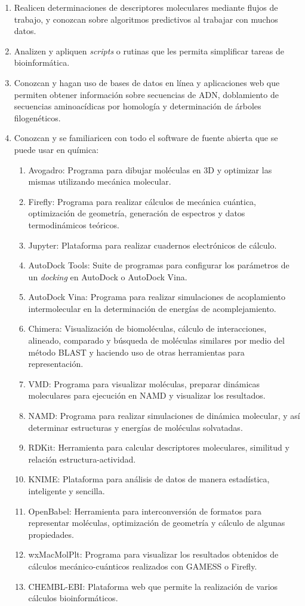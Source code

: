 \documentclass[10pt,letterpaper]{article}
\begin{document}
\begin{enumerate}
\item Realicen determinaciones de descriptores moleculares mediante flujos de trabajo, y conozcan sobre algoritmos predictivos al trabajar con muchos datos.
\item Analizen y apliquen \emph{scripts} o rutinas que les permita simplificar tareas de bioinform\'atica.
\item Conozcan y hagan uso de bases de datos en l\'inea y aplicaciones web que permiten obtener informaci\'on sobre secuencias de ADN, doblamiento de secuencias aminoac\'idicas por homolog\'ia y determinaci\'on de \'arboles filogen\'eticos.
\item Conozcan y se familiaricen con todo el software de fuente abierta que se puede usar en qu\'imica:
	\begin{enumerate}
	\item Avogadro: Programa para dibujar mol\'eculas en 3D y optimizar las mismas utilizando mec\'anica molecular.
	\item Firefly: Programa para realizar c\'alculos de mec\'anica cu\'antica, optimizaci\'on de geometr\'ia, generaci\'on de espectros y datos termodin\'amicos te\'oricos.
	\item Jupyter: Plataforma para realizar cuadernos electr\'onicos de c\'alculo.
	\item AutoDock Tools: Suite de programas para configurar los par\'ametros de un \emph{docking} en AutoDock o AutoDock Vina.
	\item AutoDock Vina: Programa para realizar simulaciones de acoplamiento intermolecular en la determinaci\'on de energ\'ias de acomplejamiento.
	\item Chimera: Visualizaci\'on de biomol\'eculas, c\'alculo de interacciones, alineado, comparado y b\'usqueda de mol\'eculas similares por medio del m\'etodo BLAST y haciendo uso de otras herramientas para representaci\'on.
	\item VMD: Programa para visualizar mol\'eculas, preparar din\'amicas moleculares para ejecuci\'on en NAMD y visualizar los resultados.
	\item NAMD: Programa para realizar simulaciones de din\'amica molecular, y as\'i  determinar estructuras y energ\'ias de mol\'eculas solvatadas.
	\item RDKit: Herramienta para calcular descriptores moleculares, similitud y relaci\'on estructura-actividad.
	\item KNIME: Plataforma para an\'alisis de datos de manera estad\'istica, inteligente y sencilla.
	\item OpenBabel: Herramienta para interconversi\'on de formatos para representar mol\'eculas, optimizaci\'on de geometr\'ia y c\'alculo de algunas propiedades.
	\item wxMacMolPlt: Programa para visualizar los resultados obtenidos de c\'alculos mec\'anico-cu\'anticos realizados con GAMESS o Firefly.
	\item CHEMBL-EBI: Plataforma web que permite la realizaci\'on de varios c\'alculos bioinform\'aticos.
	\end{enumerate}
\end{enumerate}
\end{document}
